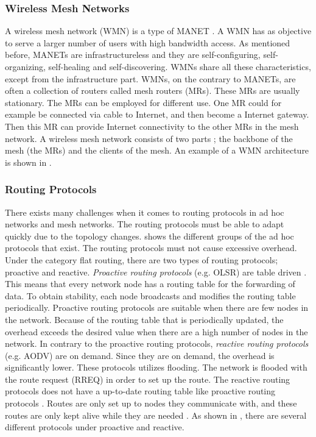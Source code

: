 \subsubsection{Wireless Mesh Networks}
A wireless mesh network (WMN) is a type of MANET \cite{wmn}. A WMN has as objective to serve a larger number of users with high bandwidth access. As mentioned before, MANETs are infrastructureless and they are self-configuring, self-organizing, self-healing and self-discovering. WMNs share all these characteristics, except from the infrastructure part. WMNs, on the contrary to MANETs, are often a collection of routers called mesh routers (MRs). These MRs are usually stationary. The MRs can be employed for different use. One MR could for example be connected via cable to Internet, and then become a Internet gateway. Then this MR can provide Internet connectivity to the other MRs in the mesh network. A wireless mesh network consists of two parts \cite{wmn}; the backbone of the mesh (the MRs) and the clients of the mesh. An example of a WMN architecture is shown in . 


\subsubsection{Routing Protocols}
There exists many challenges when it comes to routing protocols in ad hoc networks and mesh networks. The routing protocols must be able to adapt quickly due to the topology changes.  shows the different groups of the ad hoc protocols that exist. The routing protocols must not cause excessive overhead. Under the category flat routing, there are two types of routing protocols; proactive and reactive. \textit{Proactive routing protocols} (e.g. OLSR) are table driven \citep{proactivereactive}. This means that every network node has a routing table for the forwarding of data. To obtain stability, each node broadcasts and modifies the routing table periodically. Proactive routing protocols are suitable when there are few nodes in the network. Because of the routing table that is periodically updated, the overhead exceeds the desired value when there are a high number of nodes in the network. In contrary to the proactive routing protocols, \textit{reactive routing protocols} (e.g. AODV) are on demand. Since they are on demand, the overhead is significantly lower. These protocols utilizes flooding. The network is flooded with the route request (RREQ) in order to set up the route. The reactive routing protocols does not have a up-to-date routing table like proactive routing protocols \cite{proactivereactive}. Routes are only set up to nodes they communicate with, and these routes are only kept alive while they are needed  \cite{adhoc2}. As shown in , there are several different protocols under proactive and reactive. 


